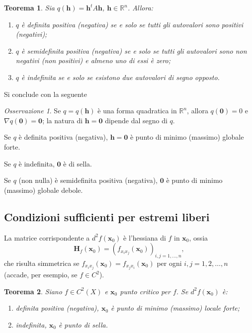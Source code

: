 \documentclass[a4paper]{book}
\numberwithin{equation}{section}
\theoremstyle{plain}
\newtheorem{teor}{Teorema}[section]
\theoremstyle{definition}
\theoremstyle{remark}
\newtheorem{oss}{Osservazione}[section]
\renewcommand{\vec}{\boldsymbol}
\theoremstyle{example}
\begin{document}
	\begin{teor}
		Sia $q(\vec{h}) = \vec{h}^tA\vec{h}$, $\vec{h} \in \mathbb{R}^n$. Allora:
		\begin{enumerate}
			\item $q$ è definita positiva (negativa) se e solo se tutti gli autovalori sono positivi (negativi);
			\item $q$ è semidefinita positiva (negativa) se e solo se tutti gli autovalori sono non negativi (non positivi) e almeno uno di essi è zero;
			\item $q$ è indefinita se e solo se esistono due autovalori di segno opposto.
		\end{enumerate}
	\end{teor}

	Si conclude con la seguente
	\begin{oss}
		Se $q = q(\vec{h})$ è una forma quadratica in $\mathbb{R}^n$, allora $q(\vec{0}) = 0$ e $\nabla q(\vec{0}) = \vec{0}$; la natura di $\vec{h} = \vec{0}$ dipende dal segno di $q$.

		Se $q$ è definita positiva (negativa), $\vec{h} = \vec{0}$ è punto di minimo (massimo) globale forte.

		Se $q$ è indefinita, $\vec{0}$ è di sella.

		Se $q$ (non nulla) è semidefinita positiva (negativa), $\vec{0}$ è punto di minimo (massimo) globale debole.
	\end{oss}

	\subsection{Condizioni sufficienti per estremi liberi}
	La matrice corrispondente a $d^2f(\vec{x}_0)$ è l'hessiana di $f$ in $\vec{x}_0$, ossia
	\begin{equation*}
		\mathbf{H}_f(\vec{x}_0) = (f_{x_ix_j}(\vec{x}_0))_{i,j = 1, \dots, n},
	\end{equation*}
	che risulta simmetrica se $f_{x_ix_j}(\vec{x}_0) = f_{x_jx_i}(\vec{x}_0)$ per ogni $i,j = 1, 2, \dots, n$ (accade, per esempio, se $f \in C^2$).

	\begin{teor}
		Siano $f \in C^2(X)$ e $\vec{x}_0$ punto critico per $f$. Se $d^2f(\vec{x}_0)$ è:
		\begin{enumerate}
			\item definita positiva (negativa), $\vec{x}_0$ è punto di minimo (massimo) locale forte;
			\item indefinita, $\vec{x}_0$ è punto di sella.
		\end{enumerate}
	\end{teor}
\end{document}

